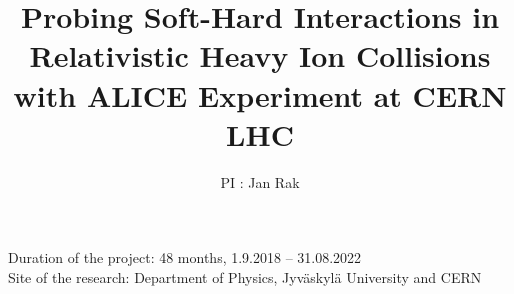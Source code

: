 \documentclass[12pt]{article}
\title{Probing Soft-Hard Interactions in Relativistic Heavy Ion Collisions with ALICE Experiment at CERN LHC}
\author{PI : Jan Rak}
\begin{document}
\maketitle
\begin{flushleft}
Duration of the project: 48 months, 1.9.2018 -- 31.08.2022\\
Site of the research: Department of Physics, Jyv\"askyl\"a University and CERN
\end{flushleft}







%


\end{document}
